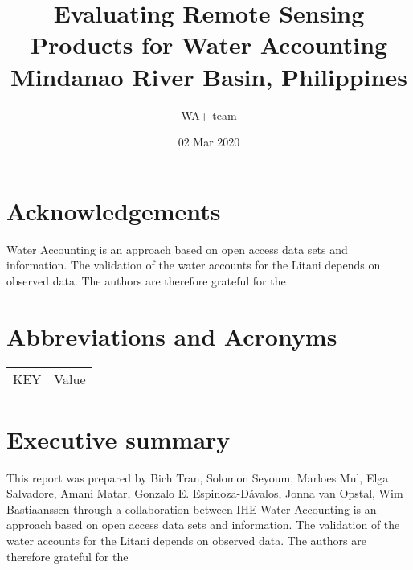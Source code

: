 \documentclass{article}%
\title{Evaluating Remote Sensing Products for Water Accounting\\Mindanao River Basin, Philippines}%
\author{WA+ team}%
\date{02 Mar 2020}%
\begin{document}
%
\normalsize%
\pagestyle{CoverPage}%
\cleardoublepage%
\newpage%
\pagestyle{FirstPage}%
\cleardoublepage%
\newpage%
\pagestyle{TOCPage}%
\cleardoublepage%
\clearpage%
%
\setcounter{page}{1}%
\pagestyle{PreambleHeader}%
\newpage%
\listoffigures%
%
\cleardoublepage%
\newpage%
\listoftables%
%
\cleardoublepage%
\newpage%
\RaggedRight%
\section*{Acknowledgements}%
\label{sec:Acknowledgements}%
Water Accounting is an approach based on open access data sets and information. The validation of the water accounts for the Litani depends on observed data. The authors are therefore grateful for the%
\linebreak

%
%
\cleardoublepage%
\newpage%
\RaggedRight%
\section*{Abbreviations and Acronyms}%
\label{sec:AbbreviationsandAcronyms}%
\begin{longtabu}{X[l]X[l]}%
\endhead%
\endfoot%
\endlastfoot%
KEY&Value\\%
\end{longtabu}

%
%
\cleardoublepage%
\newpage%
\RaggedRight%
\section*{Executive summary}%
\label{sec:Executivesummary}%
This report was prepared by Bich Tran, Solomon Seyoum, Marloes Mul, Elga Salvadore, Amani Matar, Gonzalo E. Espinoza{-}Dávalos, Jonna van Opstal, Wim Bastiaanssen through a collaboration between IHE%
\linebreak%
Water Accounting is an approach based on open access data sets and information. The validation of the water accounts for the Litani depends on observed data. The authors are therefore grateful for the%
\linebreak

%
%
\cleardoublepage%
\clearpage%
%
\setcounter{page}{1}%
\pagestyle{SectionHeader}%
\newpage%
\RaggedRight%
\end{document}
